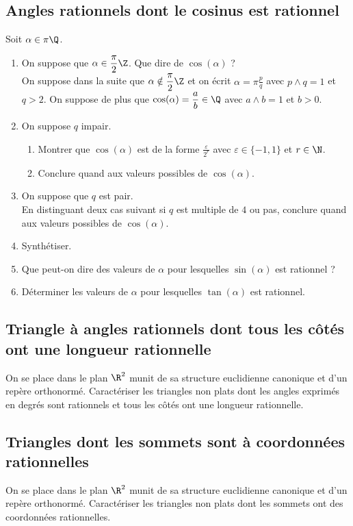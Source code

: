 \documentclass{book}
\begin{document}
	\subsection{Angles rationnels dont le cosinus est rationnel }
	Soit $\alpha\in \pi\Q$.
	\begin{enumerate}
		\item On suppose que $\alpha\in \displaystyle\frac{\pi}{2}\Z$. Que dire de $\cos(\alpha)$ ?\\
		On suppose dans la suite que $\alpha\notin\displaystyle\frac{\pi}{2}\Z$ et on écrit $\alpha=\displaystyle\pi\frac{p}{q}$ avec $p\wedge q=1$ et $q>2$. On suppose de plus que $\cos(\alpha)=\displaystyle\frac{a}{b}\in \Q$ avec $a\wedge b=1$ et $b>0$.
		\item On suppose $q$ impair.
		\begin{enumerate}[label=\alph*.]
			\item Montrer que $\cos(\alpha)$ est de la forme $\displaystyle\frac{\varepsilon}{2^r}$ avec $\varepsilon\in \{-1,1\}$ et $r\in \N$.
			\item Conclure quand aux valeurs possibles de $\cos(\alpha)$.
		\end{enumerate}
		\item On suppose que $q$ est pair.\\
		En distinguant deux cas suivant si $q$ est multiple de $4$ ou pas, conclure quand aux valeurs possibles de $\cos(\alpha)$.
		\item Synthétiser.
		\item Que peut-on dire des valeurs de $\alpha$ pour lesquelles $\sin(\alpha)$ est rationnel ?
		\item Déterminer les valeurs de $\alpha$ pour lesquelles $\tan(\alpha)$ est rationnel.
	\end{enumerate}
	
	\subsection{Triangle à angles rationnels dont tous les côtés ont une longueur rationnelle }
	On se place dans le plan $\R^2$ munit de sa structure euclidienne canonique et d'un repère orthonormé. Caractériser les triangles non plats dont les angles exprimés en degrés sont rationnels et tous les côtés ont une longueur rationnelle.
	
	\subsection{Triangles dont les sommets sont à coordonnées rationnelles }
	On se place dans le plan $\R^2$ munit de sa structure euclidienne canonique et d'un repère orthonormé. Caractériser les triangles non plats dont les sommets ont des coordonnées rationnelles.
	
\end{document}
